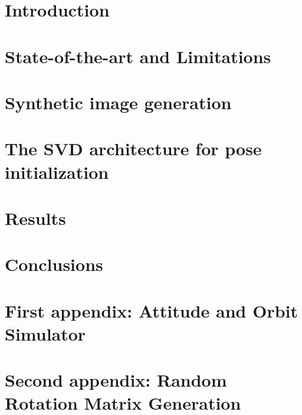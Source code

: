 \documentclass[a4paper,twoside,12pt]{book}
\begin{document}
\clearpage
\printnoidxglossary[type=\acronymtype,title=Abbreviated Terms]

\chapter*{Introduction\label{chap:introduction}}

\cleardoublepage{}

\chapter{State-of-the-art and Limitations\label{chap:first-chapter}}

\cleardoublepage{}
\chapter{Synthetic image generation\label{chap:second-chapter}}

\cleardoublepage{}
\chapter{The SVD architecture for pose initialization\label{chap:third-chapter}}

\cleardoublepage{}
\chapter{Results\label{chap:fourth-chapter}}

\cleardoublepage{}

\chapter*{Conclusions}

\cleardoublepage{}



\cleardoublepage{}

\appendix
\chapter{First appendix: Attitude and Orbit Simulator \label{app:first-appendix}}

\cleardoublepage{}
\chapter{Second appendix: Random Rotation Matrix Generation \label{app:second-appendix}}

\cleardoublepage{}

\end{document}
